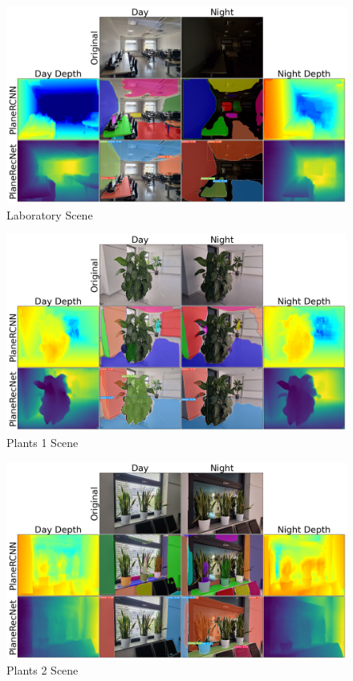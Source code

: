 \begin{figure}[H]
    \centering
    \includegraphics[width=1.0\textwidth]{images/results/Laboratory.png}
    \caption{Laboratory Scene}
    \label{figure:Laboratory}
\end{figure}

\begin{figure}[H]
    \centering
    \includegraphics[width=1.0\textwidth]{images/results/Plants_1.png}
    \caption{Plants 1 Scene}
    \label{figure:Plants_1}
\end{figure}

\begin{figure}[H]
    \centering
    \includegraphics[width=1.0\textwidth]{images/results/Plants_2.png}
    \caption{Plants 2 Scene}
    \label{figure:Plants_2}
\end{figure}

